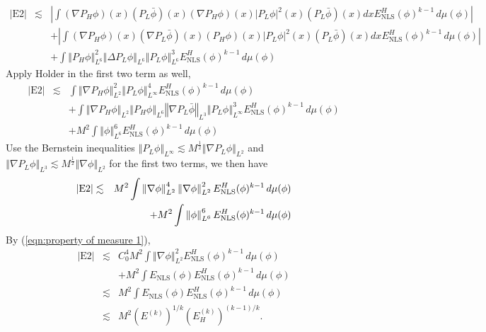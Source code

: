 \documentclass[12pt,letterpaper,leqno]{amsart}
\theoremstyle{plain}
\numberwithin{equation}{section}
\numberwithin{theorem}{section}
\numberwithin{proposition}{section}
\numberwithin{lemma}{section}
\numberwithin{corollary}{section}
\begin{document}
\begin{eqnarray*}
\left\vert \text{E2}\right\vert &\lesssim &\left\vert \int \left( \nabla
P_{H}\phi \right) (x)\left( P_{L}\bar{\phi}\right) (x)\left( \nabla
P_{H}\phi \right) (x)\left\vert P_{L}\phi \right\vert ^{2}(x)\left( P_{L}%
\bar{\phi}\right) (x)dxE_{\text{NLS}}^{H}(\phi )^{k-1}\,d\mu (\phi
)\right\vert \\
&&+\left\vert \int \left( \nabla P_{H}\phi \right) (x)\left( \nabla P_{L}%
\bar{\phi}\right) (x)\left( P_{H}\phi \right) (x)\left\vert P_{L}\phi
\right\vert ^{2}(x)\left( P_{L}\bar{\phi}\right) (x)dxE_{\text{NLS}%
}^{H}(\phi )^{k-1}\,d\mu (\phi )\right\vert \\
&&+\int \left\Vert P_{H}\phi \right\Vert _{L^{6}}^{2}\left\Vert \Delta
P_{L}\phi \right\Vert _{L^{6}}\left\Vert P_{L}\phi \right\Vert
_{L^{6}}^{3}E_{\text{NLS}}^{H}(\phi )^{k-1}\,d\mu (\phi )
\end{eqnarray*}%
Apply Holder in the first two term as well,%
\begin{eqnarray*}
\left\vert \text{E2}\right\vert &\lesssim &\int \left\Vert \nabla P_{H}\phi
\right\Vert _{L^{2}}^{2}\left\Vert P_{L}\phi \right\Vert _{L^{\infty
}}^{4}E_{\text{NLS}}^{H}(\phi )^{k-1}\,d\mu (\phi ) \\
&&+\int \left\Vert \nabla P_{H}\phi \right\Vert _{L^{2}}\left\Vert P_{H}\phi
\right\Vert _{L^{6}}\left\Vert \nabla P_{L}\bar{\phi}\right\Vert
_{L^{3}}\left\Vert P_{L}\phi \right\Vert _{L^{\infty }}^{3}E_{\text{NLS}%
}^{H}(\phi )^{k-1}\,d\mu (\phi ) \\
&&+M^{2}\int \left\Vert \phi \right\Vert _{L^{6}}^{6}E_{\text{NLS}}^{H}(\phi
)^{k-1}\,d\mu (\phi )
\end{eqnarray*}%
Use the Bernstein inequalities $\left\Vert P_{L}\phi \right\Vert _{L^{\infty
}}\lesssim M^{\frac{1}{2}}\left\Vert \nabla P_{L}\phi \right\Vert _{L^{2}}$
and $\left\Vert \nabla P_{L}\phi \right\Vert _{L^{3}}\lesssim M^{\frac{1}{2}%
}\left\Vert \nabla \phi \right\Vert _{L^{2}}$ for the first two terms, we
then have 
\begin{eqnarray*}
\left\vert \text{E2}\right\vert &\lesssim &M^{2}\int \left\Vert \nabla \phi
\right\Vert _{L^{2}}^{4}\left\Vert \nabla \phi \right\Vert _{L^{2}}^{2}E_{%
\text{NLS}}^{H}(\phi )^{k-1}\,d\mu (\phi ) \\
&&+M^{2}\int \left\Vert \phi \right\Vert _{L^{6}}^{6}E_{\text{NLS}}^{H}(\phi
)^{k-1}\,d\mu (\phi )
\end{eqnarray*}%
By (\ref{eqn:property of measure 1}), 
\begin{eqnarray*}
\left\vert \text{E2}\right\vert &\lesssim &C_{0}^{4}M^{2}\int \left\Vert
\nabla \phi \right\Vert _{L^{2}}^{2}E_{\text{NLS}}^{H}(\phi )^{k-1}\,d\mu
(\phi ) \\
&&+M^{2}\int E_{\text{NLS}}(\phi )E_{\text{NLS}}^{H}(\phi )^{k-1}\,d\mu
(\phi ) \\
&\lesssim &M^{2}\int E_{\text{NLS}}(\phi )E_{\text{NLS}}^{H}(\phi
)^{k-1}\,d\mu (\phi ) \\
&\lesssim &M^{2}(E^{(k)})^{1/k}(E_{H}^{(k)})^{(k-1)/k}.
\end{eqnarray*}%
\end{document}
